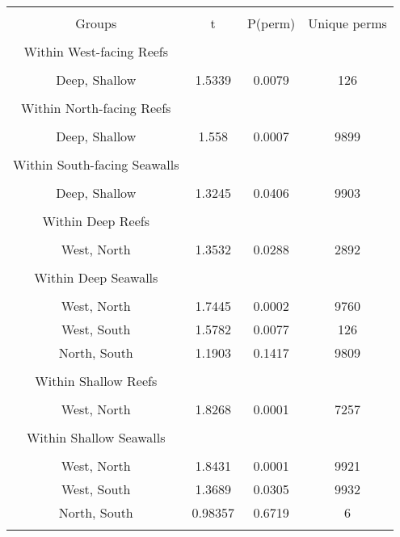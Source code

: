 \documentclass{article}
\begin{document}
\begin{table}[!htbp] \centering 
  \caption*{} 
  \label{} 
\begin{tabular}{@{\extracolsep{5pt}} cccc} 
\\[-1.8ex]\hline 
\hline \\[-1.8ex] 
Groups & t  & P(perm) & Unique perms\\ 
\hline \\[-1.8ex] 
Within West-facing Reefs\\
\hline \\[-1.8ex] 
Deep, Shallow & 1.5339	& 0.0079	&   126\\\\
Within North-facing Reefs\\
\hline \\[-1.8ex] 
Deep, Shallow & 1.558&	 0.0007	&  9899\\\\
Within South-facing Seawalls\\
\hline \\[-1.8ex] 
Deep, Shallow & 1.3245	& 0.0406	&  9903\\\\
Within Deep Reefs \\
\hline \\[-1.8ex] 
West, North & 1.3532	 &0.0288	  &2892\\\\
Within Deep Seawalls\\
\hline \\[-1.8ex] 
West, North & 1.7445	& 0.0002	&  9760 \\ 
West, South & 1.5782&	 0.0077	&   126 \\
North, South	&1.1903	& 0.1417	&  9809 \\\\
Within Shallow Reefs \\
\hline \\[-1.8ex] 
West, North & 1.8268&	 0.0001	&  7257\\\\
Within Shallow Seawalls \\ 
\hline \\[-1.8ex] 
West, North & 1.8431&	 0.0001	&  9921\\
West, South & 1.3689	& 0.0305	&  9932\\
North, South&	0.98357	& 0.6719	  &   6\\
\hline \\[-1.8ex] 
\end{tabular} 
\end{table} 
\end{document}
